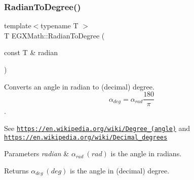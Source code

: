 \subsubsection{\texorpdfstring{Radian\+To\+Degree()}{RadianToDegree()}}
{\footnotesize\ttfamily template$<$typename T $>$ \\
T E\+G\+X\+Math\+::\+Radian\+To\+Degree (\begin{DoxyParamCaption}\item[{const T \&}]{radian }\end{DoxyParamCaption})}



Converts an angle in radian to (decimal) degree. \[\alpha_{deg}=\alpha_{rad}\frac{180}{\pi}\]. 

See \href{https://en.wikipedia.org/wiki/Degree_(angle)}{\tt https\+://en.\+wikipedia.\+org/wiki/\+Degree\+\_\+(angle)} and \href{https://en.wikipedia.org/wiki/Decimal_degrees}{\tt https\+://en.\+wikipedia.\+org/wiki/\+Decimal\+\_\+degrees} 
\begin{DoxyParams}{Parameters}
{\em radian} & $\alpha_{rad}\ (rad)$ is the angle in radians. \\
\hline
\end{DoxyParams}
\begin{DoxyReturn}{Returns}
$\alpha_{deg}\ (deg)$ is the angle in (decimal) degree. 
\end{DoxyReturn}
